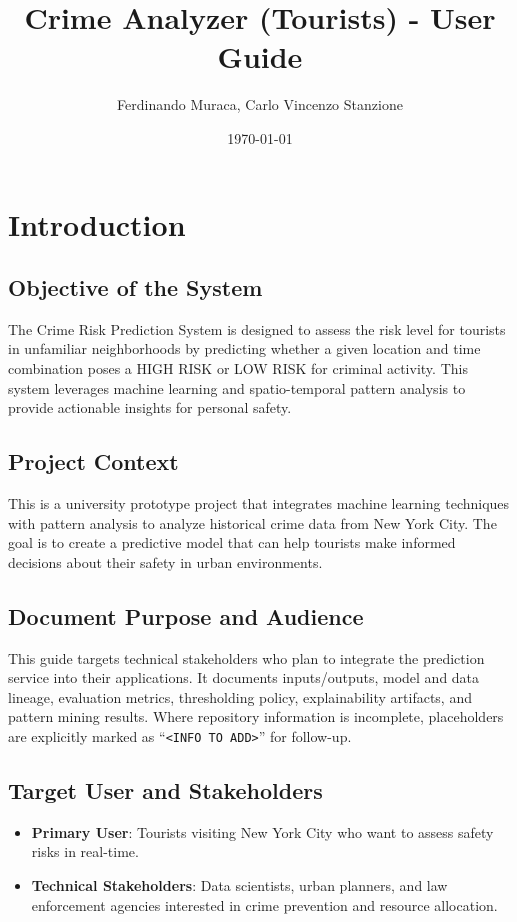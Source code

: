 \documentclass{article}
\title{Crime Analyzer (Tourists) - User Guide}
\author{Ferdinando Muraca, Carlo Vincenzo Stanzione}
\date{\today}
\begin{document}
\maketitle

\tableofcontents
\newpage

\section{Introduction}

\subsection{Objective of the System}
The Crime Risk Prediction System is designed to assess the risk level for tourists in unfamiliar neighborhoods by predicting whether a given location and time combination poses a HIGH RISK or LOW RISK for criminal activity. This system leverages machine learning and spatio-temporal pattern analysis to provide actionable insights for personal safety.

\subsection{Project Context}
This is a university prototype project that integrates machine learning techniques with pattern analysis to analyze historical crime data from New York City. The goal is to create a predictive model that can help tourists make informed decisions about their safety in urban environments.

\subsection{Document Purpose and Audience}
This guide targets technical stakeholders who plan to integrate the prediction service into their applications. It documents inputs/outputs, model and data lineage, evaluation metrics, thresholding policy, explainability artifacts, and pattern mining results. Where repository information is incomplete, placeholders are explicitly marked as ``\texttt{<INFO TO ADD>}'' for follow-up.

\subsection{Target User and Stakeholders}
\begin{itemize}
\item \textbf{Primary User}: Tourists visiting New York City who want to assess safety risks in real-time.
\item \textbf{Technical Stakeholders}: Data scientists, urban planners, and law enforcement agencies interested in crime prevention and resource allocation.
\end{itemize}
\end{document}

